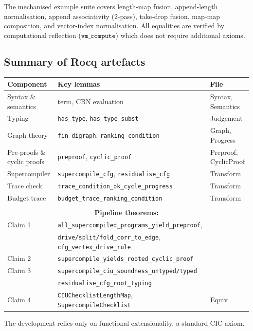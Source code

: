 The mechanised example suite covers length-map fusion, append-length normalisation, append associativity (2-pass), take-drop fusion, map-map composition, and vector-index normalisation. All equalities are verified by computational reflection ($\texttt{vm\_compute}$) which does not require additional axioms.

\subsection{Summary of Rocq artefacts}

\begin{center}
\footnotesize
\begin{tabular}{p{} >{\raggedright\arraybackslash}p{} p{}}
\toprule
\textbf{Component} & \textbf{Key lemmas} & \textbf{File} \\
\midrule
Syntax \& semantics & term, CBN evaluation & Syntax, Semantics \\
Typing & \texttt{has\_type}, \texttt{has\_type\_subst} & Judgement \\
Graph theory & \texttt{fin\_digraph}, \texttt{ranking\_condition} & Graph, Progress \\
Pre-proofs \& cyclic proofs & \texttt{preproof}, \texttt{cyclic\_proof} & Preproof, CyclicProof \\
Supercompiler & \texttt{supercompile\_cfg}, \texttt{residualise\_cfg} & Transform \\
Trace check & \texttt{trace\_condition\_ok\_cycle\_progress} & Transform \\
Budget trace & \texttt{budget\_trace\_ranking\_condition} & Transform \\
\bottomrule
\multicolumn{3}{c}{} \\
\multicolumn{3}{c}{\textbf{Pipeline theorems:}} \\
\midrule
Claim 1 & \texttt{all\_supercompiled\_programs\_yield\_preproof}, & \\
 & \texttt{drive/split/fold\_corr\_to\_edge}, \texttt{cfg\_vertex\_drive\_rule} & \\
Claim 2 & \texttt{supercompile\_yields\_rooted\_cyclic\_proof} & \\
Claim 3 & \texttt{supercompile\_ciu\_soundness\_untyped/typed} & \\
 & \texttt{residualise\_cfg\_root\_typing} & \\
Claim 4 & \texttt{CIUChecklistLengthMap}, \texttt{SupercompileChecklist} & Equiv \\
\bottomrule
\end{tabular}
\end{center}

The development relies only on functional extensionality, a standard CIC axiom.
